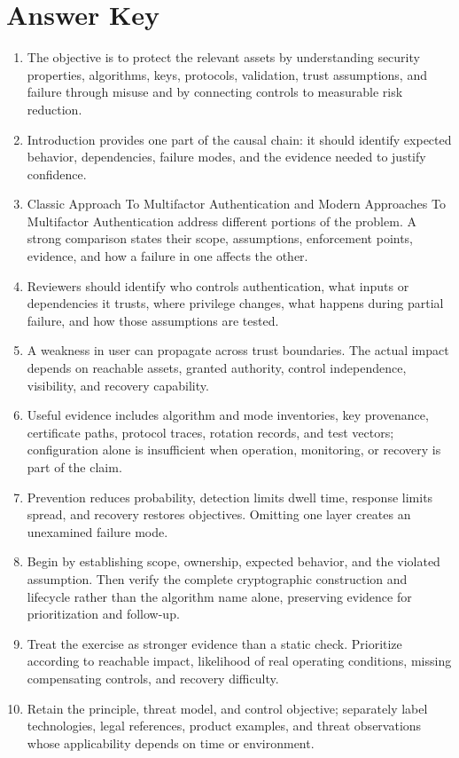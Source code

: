 \documentclass[11pt]{article}
\begin{document}
\section*{Answer Key}
\begin{enumerate}
\item The objective is to protect the relevant assets by understanding security properties, algorithms, keys, protocols, validation, trust assumptions, and failure through misuse and by connecting controls to measurable risk reduction.
\item Introduction provides one part of the causal chain: it should identify expected behavior, dependencies, failure modes, and the evidence needed to justify confidence.
\item Classic Approach To Multifactor Authentication and Modern Approaches To Multifactor Authentication address different portions of the problem. A strong comparison states their scope, assumptions, enforcement points, evidence, and how a failure in one affects the other.
\item Reviewers should identify who controls authentication, what inputs or dependencies it trusts, where privilege changes, what happens during partial failure, and how those assumptions are tested.
\item A weakness in user can propagate across trust boundaries. The actual impact depends on reachable assets, granted authority, control independence, visibility, and recovery capability.
\item Useful evidence includes algorithm and mode inventories, key provenance, certificate paths, protocol traces, rotation records, and test vectors; configuration alone is insufficient when operation, monitoring, or recovery is part of the claim.
\item Prevention reduces probability, detection limits dwell time, response limits spread, and recovery restores objectives. Omitting one layer creates an unexamined failure mode.
\item Begin by establishing scope, ownership, expected behavior, and the violated assumption. Then verify the complete cryptographic construction and lifecycle rather than the algorithm name alone, preserving evidence for prioritization and follow-up.
\item Treat the exercise as stronger evidence than a static check. Prioritize according to reachable impact, likelihood of real operating conditions, missing compensating controls, and recovery difficulty.
\item Retain the principle, threat model, and control objective; separately label technologies, legal references, product examples, and threat observations whose applicability depends on time or environment.
\end{enumerate}
\end{document}
